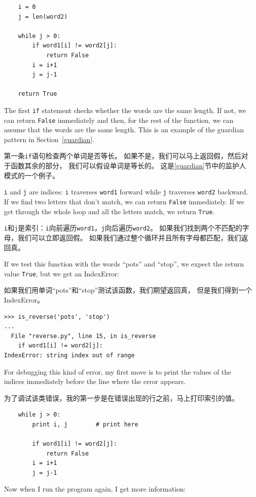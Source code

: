 \documentclass[10pt]{book}
\begin{document}
\begin{CJK}{UTF8}{gbsn}
\begin{verbatim}
    i = 0
    j = len(word2)

    while j > 0:
        if word1[i] != word2[j]:
            return False
        i = i+1
        j = j-1

    return True
\end{verbatim}
%
The first {\tt if} statement checks whether the words are the
same length.  If not, we can return {\tt False} immediately
and then, for the rest of the function, we can assume that the words
are the same length.  This is an example of the guardian pattern
in Section~\ref{guardian}.

第一条{\tt if}语句检查两个单词是否等长。
如果不是，我们可以马上返回假，然后对于函数其余的部分，
我们可以假设单词是等长的。
这是\ref{guardian}节中的监护人模式的一个例子。

{\tt i} and {\tt j} are indices: {\tt i} traverses {\tt word1}
forward while {\tt j} traverses {\tt word2} backward.  If we find
two letters that don't match, we can return {\tt False} immediately.
If we get through the whole loop and all the letters match, we
return {\tt True}.

{\tt i}和{\tt j}是索引：{\tt i}向前遍历{\tt word1}，{\tt j}向后遍历{\tt word2}。
如果我们找到两个不匹配的字母，我们可以立即返回假。
如果我们通过整个循环并且所有字母都匹配，我们返回真。

If we test this function with the words ``pots'' and ``stop'', we
expect the return value {\tt True}, but we get an IndexError:

如果我们用单词``pots''和``stop''测试该函数，我们期望返回真，
但是我们得到一个IndexError。

\begin{verbatim}
>>> is_reverse('pots', 'stop')
...
  File "reverse.py", line 15, in is_reverse
    if word1[i] != word2[j]:
IndexError: string index out of range
\end{verbatim}
%
For debugging this kind of error, my first move is to
print the values of the indices immediately before the line
where the error appears.

为了调试该类错误，我的第一步是在错误出现的行之前，马上打印索引的值。

\begin{verbatim}
    while j > 0:
        print i, j        # print here
        
        if word1[i] != word2[j]:
            return False
        i = i+1
        j = j-1
\end{verbatim}
%
Now when I run the program again, I get more information:


\end{CJK}
\end{document}
